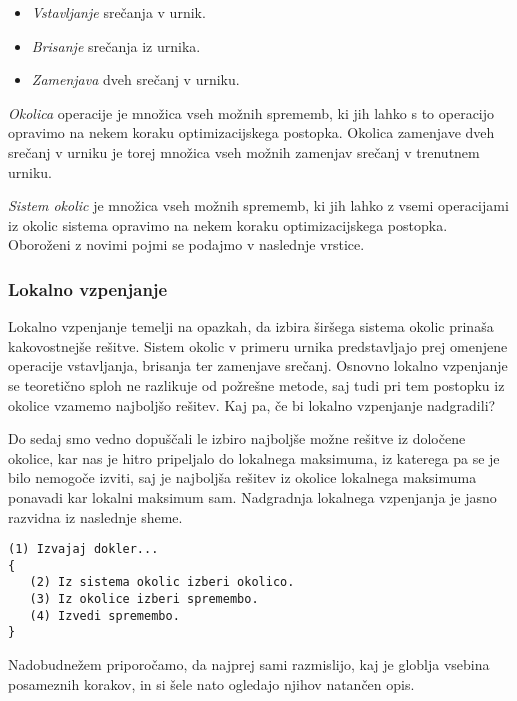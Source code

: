 \documentclass[a4paper,10pt]{article}
\begin{document}
\begin{itemize}
    \item \emph{Vstavljanje} srečanja v urnik.
    \item \emph{Brisanje} srečanja iz urnika.
    \item \emph{Zamenjava} dveh srečanj v urniku.
\end{itemize}

\noindent \emph{Okolica} operacije je množica vseh možnih sprememb, ki jih lahko s to operacijo opravimo na nekem koraku optimizacijskega postopka. Okolica zamenjave dveh srečanj v urniku je torej množica vseh možnih zamenjav srečanj v trenutnem urniku.

\emph{Sistem okolic} je množica vseh možnih sprememb, ki jih lahko z vsemi operacijami iz okolic sistema opravimo na nekem koraku optimizacijskega postopka. Oboroženi z novimi pojmi se podajmo v naslednje vrstice.
\subsubsection{Lokalno vzpenjanje}
Lokalno vzpenjanje temelji na opazkah, da izbira širšega sistema okolic prinaša kakovostnejše rešitve. Sistem okolic v primeru urnika predstavljajo prej omenjene operacije vstavljanja, brisanja ter zamenjave srečanj. Osnovno lokalno vzpenjanje se teoretično sploh ne razlikuje od požrešne metode, saj tudi pri tem postopku iz okolice vzamemo najboljšo rešitev. Kaj pa, če bi lokalno vzpenjanje nadgradili?

Do sedaj smo vedno dopuščali le izbiro najboljše možne rešitve iz določene okolice, kar nas je hitro pripeljalo do lokalnega maksimuma, iz katerega pa se je bilo nemogoče izviti, saj je najboljša rešitev iz okolice lokalnega maksimuma ponavadi kar lokalni maksimum sam. Nadgradnja lokalnega vzpenjanja je jasno razvidna iz naslednje sheme.

\begin{verbatim}
(1) Izvajaj dokler...
{
   (2) Iz sistema okolic izberi okolico.
   (3) Iz okolice izberi spremembo.
   (4) Izvedi spremembo.
}
\end{verbatim}

Nadobudnežem priporočamo, da najprej sami razmislijo, kaj je globlja vsebina posameznih korakov, in si šele nato ogledajo njihov natančen opis.
\end{document}
